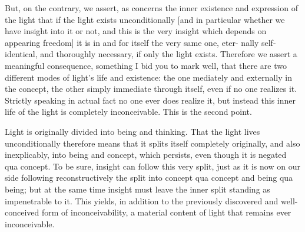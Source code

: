 But, on the contrary, we assert,
as concerns the inner existence and
expression of the light
that if the light exists unconditionally
[and in particular whether we have insight into it or not,
and this is the very insight which depends on appearing freedom]
it is in and for itself the very same one, eter-
nally self-identical, and thoroughly necessary,
if only the light exists.
Therefore we assert a meaningful consequence,
something I bid you to mark well,
that there are two different modes
of light’s life and existence:
the one mediately and externally in the concept,
the other simply immediate through itself,
even if no one realizes it.
Strictly speaking in actual fact
no one ever does realize it,
but instead this inner life of the light is
completely inconceivable.
This is the second point.

Light is originally divided into being and thinking.
That the light lives unconditionally therefore means
that it splits itself completely originally,
and also inexplicably, into being and concept,
which persists, even though it is negated qua concept.
To be sure, insight can follow this very split,
just as it is now on our side following reconstructively
the split into concept qua concept and being qua being;
but at the same time insight must leave the inner
split standing as impenetrable to it.
This yields, in addition to the previously
discovered and well-conceived form of inconceivability,
a material content of light that remains ever inconceivable.

